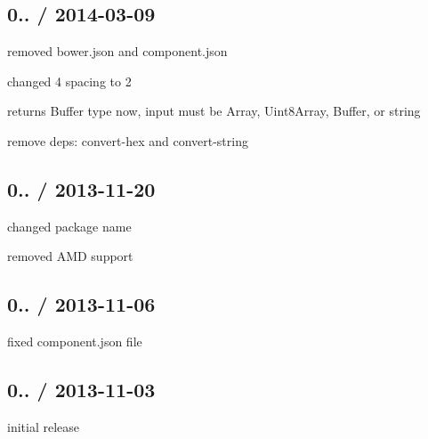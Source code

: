 \subsection*{0.. / 2014-\/03-\/09 }


\begin{DoxyItemize}
\item removed bower.\+json and component.\+json
\item changed 4 spacing to 2
\item returns {\ttfamily Buffer} type now, input must be Array, Uint8\+Array, Buffer, or string
\item remove deps\+: {\ttfamily convert-\/hex} and {\ttfamily convert-\/string}
\end{DoxyItemize}

\subsection*{0.. / 2013-\/11-\/20 }


\begin{DoxyItemize}
\item changed package name
\item removed A\+MD support
\end{DoxyItemize}

\subsection*{0.. / 2013-\/11-\/06 }


\begin{DoxyItemize}
\item fixed component.\+json file
\end{DoxyItemize}

\subsection*{0.. / 2013-\/11-\/03 }


\begin{DoxyItemize}
\item initial release 
\end{DoxyItemize}